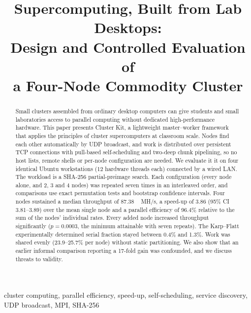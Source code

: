 \documentclass[conference,10pt]{IEEEtran}
\newcommand{\MHs}{\,MH/s}
\begin{document}
\title{Supercomputing, Built from Lab Desktops:\\Design and Controlled Evaluation of\\a Four-Node Commodity Cluster}

\author{
}

\maketitle

\begin{abstract}
Small clusters assembled from ordinary desktop computers can give students and small laboratories access to parallel computing without dedicated high-performance hardware. This paper presents Cluster Kit, a lightweight master--worker framework that applies the principles of cluster supercomputers at classroom scale. Nodes find each other automatically by UDP broadcast, and work is distributed over persistent TCP connections with pull-based self-scheduling and two-deep chunk pipelining, so no host lists, remote shells or per-node configuration are needed. We evaluate it it on four identical Ubuntu workstations (12 hardware threads each) connected by a wired LAN. The workload is a SHA-256 partial-preimage search. Each configuration (every node alone, and 2, 3 and 4 nodes) was repeated seven times in an interleaved order, and comparisons use exact permutation tests and bootstrap confidence intervals. Four nodes sustained a median throughput of \SI{87.38}{\MHs}, a speed-up of 3.86 (95\% CI 3.81--3.89) over the mean single node and a parallel efficiency of 96.4\% relative to the sum of the nodes' individual rates. Every added node increased throughput significantly ($p = 0.0003$, the minimum attainable with seven repeats). The Karp--Flatt experimentally determined serial fraction stayed between 0.4\% and 1.3\%. Work was shared evenly (23.9--25.7\% per node) without static partitioning. We also show that an earlier informal comparison reporting a 17-fold gain was confounded, and we discuss threats to validity.
\end{abstract}

\begin{IEEEkeywords}
cluster computing, parallel efficiency, speed-up, self-scheduling, service discovery, UDP broadcast, MPI, SHA-256
\end{IEEEkeywords}
\end{document}
